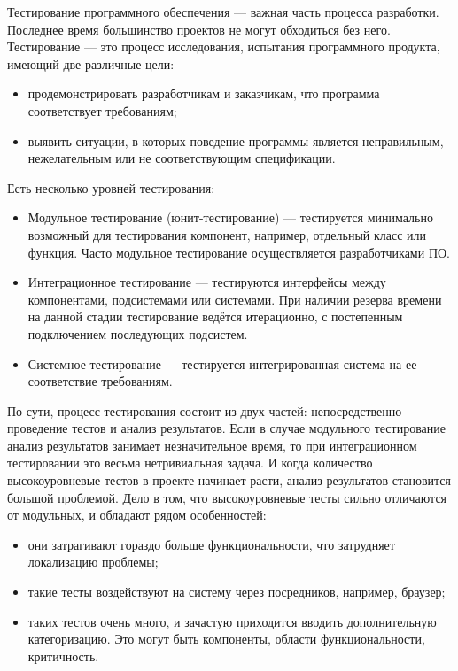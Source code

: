 \startprefacepage

Тестирование программного обеспечения --- важная часть процесса разработки. Последнее время большинство проектов не могут обходиться без него. Тестирование --- это процесс исследования, испытания программного продукта, имеющий две различные цели:

\begin{itemize}
\item продемонстрировать разработчикам и заказчикам, что программа соответствует требованиям;
\item выявить ситуации, в которых поведение программы является неправильным, нежелательным или не соответствующим спецификации.  
\end{itemize}

Есть несколько уровней тестирования:

\begin{itemize}
\item Модульное тестирование (юнит-тестирование) --- тестируется минимально возможный для тестирования компонент, например, отдельный класс или функция. Часто модульное тестирование осуществляется разработчиками ПО.
\item Интеграционное тестирование --- тестируются интерфейсы между компонентами, подсистемами или системами. При наличии резерва времени на данной стадии тестирование ведётся итерационно, с постепенным подключением последующих подсистем.
\item Системное тестирование --- тестируется интегрированная система на ее соответствие требованиям.
\end{itemize}

По сути, процесс тестирования состоит из двух частей: непосредственно проведение тестов и анализ результатов. Если в случае модульного тестирование анализ результатов занимает незначительное время, то при интеграционном тестировании это весьма нетривиальная задача. И когда количество высокоуровневые тестов в проекте начинает расти, анализ результатов становится большой проблемой. Дело в том, что высокоуровневые тесты сильно отличаются от модульных, и обладают рядом особенностей:

\begin{itemize}
\item они затрагивают гораздо больше функциональности, что затрудняет локализацию проблемы; 
\item такие тесты воздействуют на систему через посредников, например, браузер;
\item таких тестов очень много, и зачастую приходится вводить дополнительную категоризацию. Это могут быть компоненты, области функциональности, критичность.
\end{itemize}

